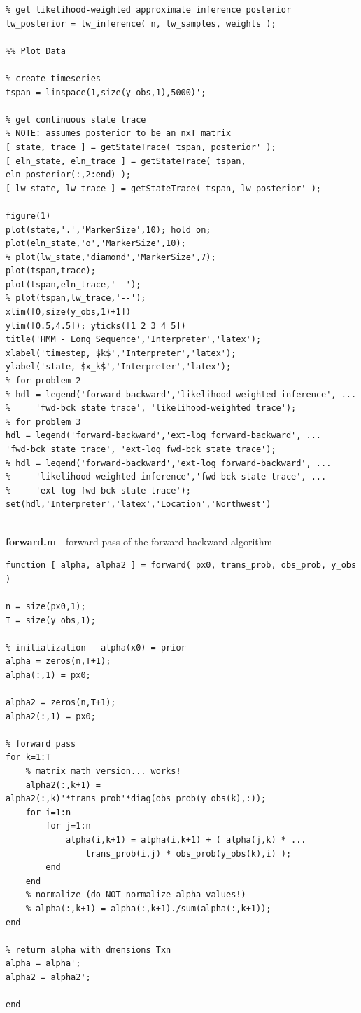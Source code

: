 \documentclass[]{article}
\begin{document}
\begin{lstlisting}
% get likelihood-weighted approximate inference posterior
lw_posterior = lw_inference( n, lw_samples, weights );

%% Plot Data

% create timeseries
tspan = linspace(1,size(y_obs,1),5000)';

% get continuous state trace
% NOTE: assumes posterior to be an nxT matrix
[ state, trace ] = getStateTrace( tspan, posterior' );
[ eln_state, eln_trace ] = getStateTrace( tspan, eln_posterior(:,2:end) );
[ lw_state, lw_trace ] = getStateTrace( tspan, lw_posterior' );

figure(1)
plot(state,'.','MarkerSize',10); hold on;
plot(eln_state,'o','MarkerSize',10);
% plot(lw_state,'diamond','MarkerSize',7);
plot(tspan,trace);
plot(tspan,eln_trace,'--');
% plot(tspan,lw_trace,'--');
xlim([0,size(y_obs,1)+1])
ylim([0.5,4.5]); yticks([1 2 3 4 5])
title('HMM - Long Sequence','Interpreter','latex');
xlabel('timestep, $k$','Interpreter','latex');
ylabel('state, $x_k$','Interpreter','latex');
% for problem 2
% hdl = legend('forward-backward','likelihood-weighted inference', ...
%     'fwd-bck state trace', 'likelihood-weighted trace');
% for problem 3
hdl = legend('forward-backward','ext-log forward-backward', ...
'fwd-bck state trace', 'ext-log fwd-bck state trace');
% hdl = legend('forward-backward','ext-log forward-backward', ...
%     'likelihood-weighted inference','fwd-bck state trace', ...
%     'ext-log fwd-bck state trace');
set(hdl,'Interpreter','latex','Location','Northwest')


\end{lstlisting}

\textbf{forward.m} - forward pass of the forward-backward algorithm
\begin{lstlisting}
function [ alpha, alpha2 ] = forward( px0, trans_prob, obs_prob, y_obs )

n = size(px0,1);
T = size(y_obs,1);

% initialization - alpha(x0) = prior
alpha = zeros(n,T+1);
alpha(:,1) = px0;

alpha2 = zeros(n,T+1);
alpha2(:,1) = px0;

% forward pass
for k=1:T
	% matrix math version... works!
	alpha2(:,k+1) = alpha2(:,k)'*trans_prob'*diag(obs_prob(y_obs(k),:));
	for i=1:n
		for j=1:n
			alpha(i,k+1) = alpha(i,k+1) + ( alpha(j,k) * ...
				trans_prob(i,j) * obs_prob(y_obs(k),i) );
		end
	end
	% normalize (do NOT normalize alpha values!)
	% alpha(:,k+1) = alpha(:,k+1)./sum(alpha(:,k+1));
end

% return alpha with dmensions Txn
alpha = alpha';
alpha2 = alpha2';

end
\end{lstlisting}
\end{document}
